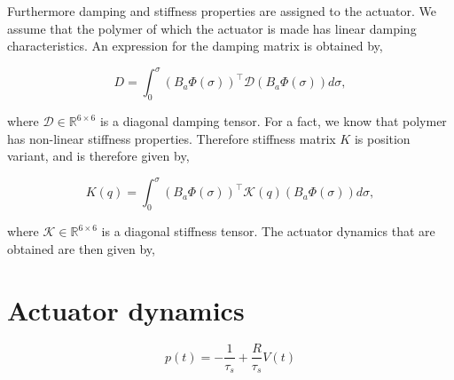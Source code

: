 Furthermore damping and stiffness properties are assigned to the actuator. We assume that the polymer of which the actuator is made has linear damping characteristics. An expression for the damping matrix is obtained by,

\begin{equation}
    D = \int_0^\sigma (B_a \Phi(\sigma))^\top  \mathcal{D} (B_a \Phi(\sigma)) d\sigma,
\end{equation}

where $\mathcal{D} \in \mathbb{R}^{6 \times 6}$ is a diagonal damping tensor. For a fact, we know that polymer has non-linear stiffness properties. Therefore stiffness matrix $K$ is position variant, and is therefore given by,

\begin{equation}
    K(q) = \int_0^\sigma (B_a \Phi(\sigma) )^\top \mathcal{K}(q) (B_a \Phi(\sigma))  d\sigma,
\end{equation}

where $\mathcal{K} \in \mathbb{R}^{6 \times 6}$ is a diagonal stiffness tensor. The actuator dynamics that are obtained are then given by,







\section{Actuator dynamics}




\begin{equation}
    p(t) = -\frac{1}{\tau_s} + \frac{R}{\tau_s}V(t)
\end{equation}








